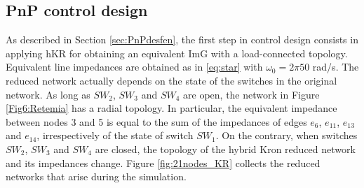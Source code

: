 \documentclass[a4paper]{article}
\theoremstyle{plain}
\begin{document}
\subsection{PnP control design}
As described in Section \ref{sec:PnPdesfen}, the first step in control design consists in applying hKR for obtaining an equivalent ImG with a load-connected topology. Equivalent line impedances are obtained as in \eqref{eq:star} with $\omega_0=2\pi50$ rad/s.
The reduced network actually depends on the state of the switches in
the original network. As long as $SW_2$, $SW_3$ and $SW_4$ are open,
the network in Figure \ref{Fig6:Retemia} has a radial topology. In
particular, the equivalent impedance between nodes 3 and 5 is equal to
the sum of the impedances of edges $e_{6}$, $e_{11}$, $e_{13}$ and
$e_{14}$, irrespectively of the state of switch $SW_1$. On the contrary,
when switches $SW_2$, $SW_3$ and $SW_4$ are closed, the topology of
the hybrid Kron reduced network and its impedances change. Figure
\ref{fig:21nodes_KR} collects the reduced networks that arise
during the simulation. 
\end{document}
